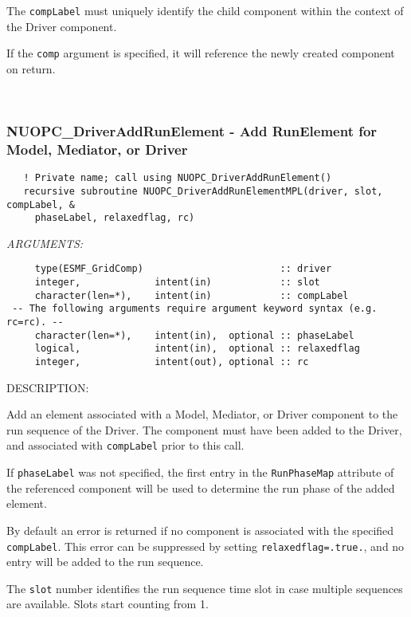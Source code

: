    The {\tt compLabel} must uniquely identify the child component within the 
   context of the Driver component.
  
   If the {\tt comp} argument is specified, it will reference the newly created
   component on return. 
 
\mbox{}\hrulefill\ 
 
\subsubsection [NUOPC\_DriverAddRunElement] {NUOPC\_DriverAddRunElement - Add RunElement for Model, Mediator, or Driver}


  
\begin{verbatim}   ! Private name; call using NUOPC_DriverAddRunElement()
   recursive subroutine NUOPC_DriverAddRunElementMPL(driver, slot, compLabel, &
     phaseLabel, relaxedflag, rc)\end{verbatim}{\em ARGUMENTS:}
\begin{verbatim}     type(ESMF_GridComp)                        :: driver
     integer,             intent(in)            :: slot
     character(len=*),    intent(in)            :: compLabel
 -- The following arguments require argument keyword syntax (e.g. rc=rc). --
     character(len=*),    intent(in),  optional :: phaseLabel
     logical,             intent(in),  optional :: relaxedflag
     integer,             intent(out), optional :: rc \end{verbatim}
{\sf DESCRIPTION:\\ }


   Add an element associated with a Model, Mediator, or Driver component to the
   run sequence of the Driver. The component must have been added to the Driver,
   and associated with {\tt compLabel} prior to this call.
  
   If {\tt phaseLabel} was not specified, the first entry in the
   {\tt RunPhaseMap} attribute of the referenced component will be used to 
   determine the run phase of the added element.
  
   By default an error is returned if no component is associated with the 
   specified {\tt compLabel}. This error can be suppressed by setting
   {\tt relaxedflag=.true.}, and no entry will be added to the run sequence.
  
   The {\tt slot} number identifies the run sequence time slot in case multiple
   sequences are available. Slots start counting from 1. 
 
